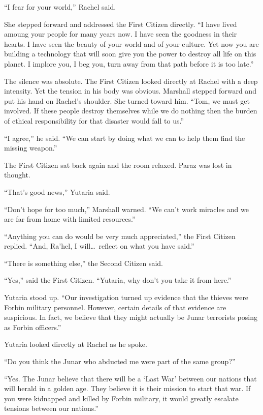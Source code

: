 ``I fear for your world,'' Rachel said.

She stepped forward and addressed the First Citizen directly. ``I have lived amoung your people
for many years now. I have seen the goodness in their hearts. I have seen the beauty of your
world and of your culture. Yet now you are building a technology that will soon give you the
power to destroy all life on this planet. I implore you, I beg you, turn away from that path
before it is too late.''

The silence was absolute. The First Citizen looked directly at Rachel with a deep intensity. Yet
the tension in his body was obvious. Marshall stepped forward and put his hand on Rachel's
shoulder. She turned toward him. ``Tom, we must get involved. If these people destroy themselves
while we do nothing then the burden of ethical responsibility for that disaster would fall to
us.''

``I agree,'' he said. ``We can start by doing what we can to help them find the missing
weapon.''

The First Citizen sat back again and the room relaxed. Paraz was lost in thought.

``That's good news,'' Yutaria said.

``Don't hope for too much,'' Marshall warned. ``We can't work miracles and we are far from home
with limited resources.''

``Anything you can do would be very much appreciated,'' the First Citizen replied. ``And,
Ra'hel, I will\ldots\ reflect on what you have said.''

``There is something else,'' the Second Citizen said.

``Yes,'' said the First Citizen. ``Yutaria, why don't you take it from here.''

Yutaria stood up. ``Our investigation turned up evidence that the thieves were Forbin military
personnel. However, certain details of that evidence are suspicious. In fact, we believe that
they might actually be Junar terrorists posing as Forbin officers.''

Yutaria looked directly at Rachel as he spoke.

``Do you think the Junar who abducted me were part of the same group?''

``Yes. The Junar believe that there will be a `Last War' between our nations that will herald in
a golden age. They believe it is their mission to start that war. If you were kidnapped and
killed by Forbin military, it would greatly escalate tensions between our nations.''

